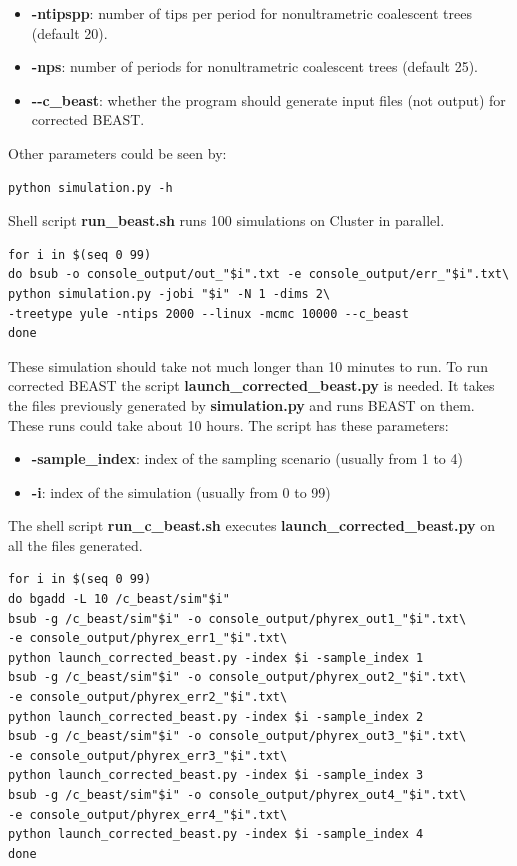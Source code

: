 \begin{itemize}
\item \textbf{-ntipspp}: number of tips per period for nonultrametric coalescent trees (default 20).

\item \textbf{-nps}: number of periods for nonultrametric coalescent trees (default 25).

\item \textbf{-{}-c\_beast}: whether the program should generate input files (not output) for corrected BEAST.


\end{itemize}

Other parameters could be seen by:

\begin{verbatim}
python simulation.py -h
\end{verbatim}


Shell script \textbf{run\_beast.sh} runs 100 simulations on Cluster in parallel.
\begin{verbatim}
for i in $(seq 0 99)
do bsub -o console_output/out_"$i".txt -e console_output/err_"$i".txt\
python simulation.py -jobi "$i" -N 1 -dims 2\
-treetype yule -ntips 2000 --linux -mcmc 10000 --c_beast
done
\end{verbatim}


These simulation should take not much longer than 10 minutes to run. To run corrected BEAST the script \textbf{launch\_corrected\_beast.py} is needed. It takes the files previously generated by \textbf{simulation.py} and runs BEAST on them. These runs could take about 10 hours. The script has these parameters:

\begin{itemize}
\item \textbf{-sample\_index}: index of the sampling scenario (usually from 1 to 4)
\item \textbf{-i}: index of the simulation (usually from 0 to 99)
\end{itemize}

The shell script \textbf{run\_c\_beast.sh} executes \textbf{launch\_corrected\_beast.py} on all the files generated.
\begin{verbatim}
for i in $(seq 0 99)
do bgadd -L 10 /c_beast/sim"$i"
bsub -g /c_beast/sim"$i" -o console_output/phyrex_out1_"$i".txt\
-e console_output/phyrex_err1_"$i".txt\
python launch_corrected_beast.py -index $i -sample_index 1
bsub -g /c_beast/sim"$i" -o console_output/phyrex_out2_"$i".txt\
-e console_output/phyrex_err2_"$i".txt\
python launch_corrected_beast.py -index $i -sample_index 2
bsub -g /c_beast/sim"$i" -o console_output/phyrex_out3_"$i".txt\
-e console_output/phyrex_err3_"$i".txt\
python launch_corrected_beast.py -index $i -sample_index 3
bsub -g /c_beast/sim"$i" -o console_output/phyrex_out4_"$i".txt\
-e console_output/phyrex_err4_"$i".txt\
python launch_corrected_beast.py -index $i -sample_index 4
done
\end{verbatim}

